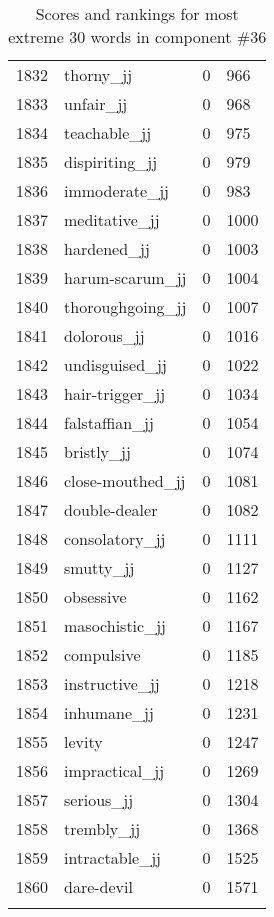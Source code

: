 \begin{longtable}[!htbp]{| rlr@{.}l |}
    1832 & thorny\_jj & 0 & 966 \\
    1833 & unfair\_jj & 0 & 968 \\
    1834 & teachable\_jj & 0 & 975 \\
    1835 & dispiriting\_jj & 0 & 979 \\
    1836 & immoderate\_jj & 0 & 983 \\
    1837 & meditative\_jj & 0 & 1000 \\
    1838 & hardened\_jj & 0 & 1003 \\
    1839 & harum-scarum\_jj & 0 & 1004 \\
    1840 & thoroughgoing\_jj & 0 & 1007 \\
    1841 & dolorous\_jj & 0 & 1016 \\
    1842 & undisguised\_jj & 0 & 1022 \\
    1843 & hair-trigger\_jj & 0 & 1034 \\
    1844 & falstaffian\_jj & 0 & 1054 \\
    1845 & bristly\_jj & 0 & 1074 \\
    1846 & close-mouthed\_jj & 0 & 1081 \\
    1847 & double-dealer & 0 & 1082 \\
    1848 & consolatory\_jj & 0 & 1111 \\
    1849 & smutty\_jj & 0 & 1127 \\
    1850 & obsessive & 0 & 1162 \\
    1851 & masochistic\_jj & 0 & 1167 \\
    1852 & compulsive & 0 & 1185 \\
    1853 & instructive\_jj & 0 & 1218 \\
    1854 & inhumane\_jj & 0 & 1231 \\
    1855 & levity & 0 & 1247 \\
    1856 & impractical\_jj & 0 & 1269 \\
    1857 & serious\_jj & 0 & 1304 \\
    1858 & trembly\_jj & 0 & 1368 \\
    1859 & intractable\_jj & 0 & 1525 \\
    1860 & dare-devil & 0 & 1571 \\
    \hline
    \caption{Scores and rankings for most extreme 30 words in component \#36} \\
\end{longtable}
